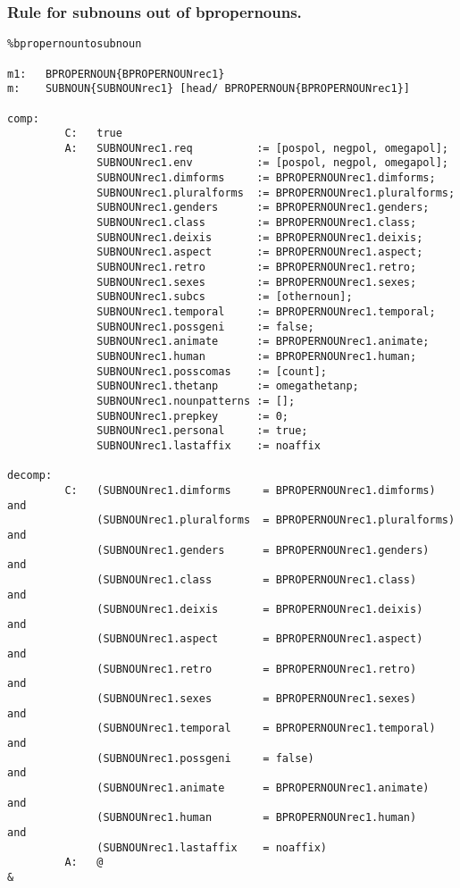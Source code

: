 \subsubsection{Rule for subnouns out of bpropernouns.}
\begin{verbatim}
%bpropernountosubnoun

m1:   BPROPERNOUN{BPROPERNOUNrec1}
m:    SUBNOUN{SUBNOUNrec1} [head/ BPROPERNOUN{BPROPERNOUNrec1}]

comp:    
         C:   true
         A:   SUBNOUNrec1.req          := [pospol, negpol, omegapol];
              SUBNOUNrec1.env          := [pospol, negpol, omegapol];
              SUBNOUNrec1.dimforms     := BPROPERNOUNrec1.dimforms;
              SUBNOUNrec1.pluralforms  := BPROPERNOUNrec1.pluralforms;
              SUBNOUNrec1.genders      := BPROPERNOUNrec1.genders;
              SUBNOUNrec1.class        := BPROPERNOUNrec1.class;
              SUBNOUNrec1.deixis       := BPROPERNOUNrec1.deixis;
              SUBNOUNrec1.aspect       := BPROPERNOUNrec1.aspect;
              SUBNOUNrec1.retro        := BPROPERNOUNrec1.retro;
              SUBNOUNrec1.sexes        := BPROPERNOUNrec1.sexes;
              SUBNOUNrec1.subcs        := [othernoun];
              SUBNOUNrec1.temporal     := BPROPERNOUNrec1.temporal;
              SUBNOUNrec1.possgeni     := false;
              SUBNOUNrec1.animate      := BPROPERNOUNrec1.animate;
              SUBNOUNrec1.human        := BPROPERNOUNrec1.human;
              SUBNOUNrec1.posscomas    := [count];
              SUBNOUNrec1.thetanp      := omegathetanp;
              SUBNOUNrec1.nounpatterns := [];
              SUBNOUNrec1.prepkey      := 0;
              SUBNOUNrec1.personal     := true;
              SUBNOUNrec1.lastaffix    := noaffix

decomp:  
         C:   (SUBNOUNrec1.dimforms     = BPROPERNOUNrec1.dimforms)    and
              (SUBNOUNrec1.pluralforms  = BPROPERNOUNrec1.pluralforms) and
              (SUBNOUNrec1.genders      = BPROPERNOUNrec1.genders)     and
              (SUBNOUNrec1.class        = BPROPERNOUNrec1.class)       and
              (SUBNOUNrec1.deixis       = BPROPERNOUNrec1.deixis)      and
              (SUBNOUNrec1.aspect       = BPROPERNOUNrec1.aspect)      and
              (SUBNOUNrec1.retro        = BPROPERNOUNrec1.retro)       and
              (SUBNOUNrec1.sexes        = BPROPERNOUNrec1.sexes)       and
              (SUBNOUNrec1.temporal     = BPROPERNOUNrec1.temporal)    and
              (SUBNOUNrec1.possgeni     = false)                       and
              (SUBNOUNrec1.animate      = BPROPERNOUNrec1.animate)     and
              (SUBNOUNrec1.human        = BPROPERNOUNrec1.human)       and
              (SUBNOUNrec1.lastaffix    = noaffix)   
         A:   @
&
\end{verbatim}
\newpage
